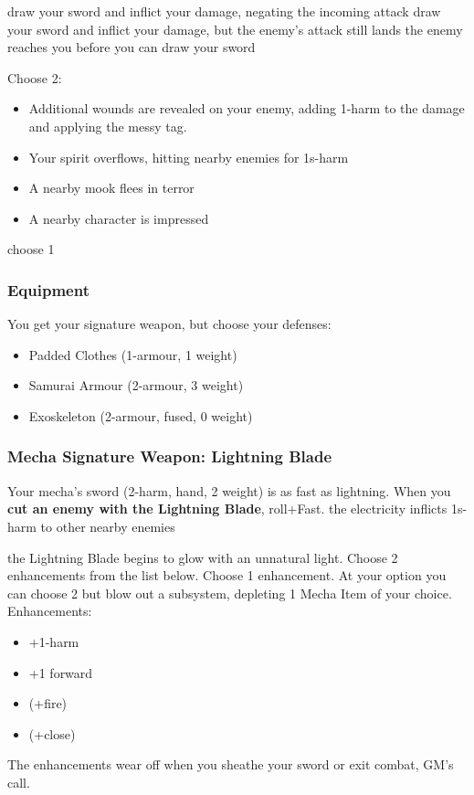 {draw your sword and inflict your damage, negating the incoming attack}
{draw your sword and inflict your damage, but the enemy's attack still lands}
{the enemy reaches you before you can draw your sword}

{Choose 2:
\begin{itemize}
\item Additional wounds are revealed on your enemy, adding 1-harm to the damage and applying the messy tag.
\item Your spirit overflows, hitting nearby enemies for 1s-harm
\item A nearby mook flees in terror
\item A nearby character is impressed
\end{itemize}}
{choose 1}

\subsubsection{Equipment}
You get your signature weapon, but choose your defenses:
\begin{itemize}
\item Padded Clothes (1-armour, 1 weight)
\item Samurai Armour (2-armour, 3 weight)
\item Exoskeleton (2-armour, fused, 0 weight)
\end{itemize}

\subsubsection{Mecha Signature Weapon: Lightning Blade}
Your mecha's sword (2-harm, hand, 2 weight) is as fast as lightning. When you \textbf{cut an enemy with the Lightning Blade}, roll+Fast.
{the electricity inflicts 1s-harm to other nearby enemies}

{the Lightning Blade begins to glow with an unnatural light. Choose 2 enhancements from the list below.}
{Choose 1 enhancement. At your option you can choose 2 but blow out a subsystem, depleting 1 Mecha Item of your choice.}
Enhancements:
\begin{itemize}
\item +1-harm
\item +1 forward
\item (+fire)
\item (+close)
\end{itemize}
The enhancements wear off when you sheathe your sword or exit combat, GM's call.



